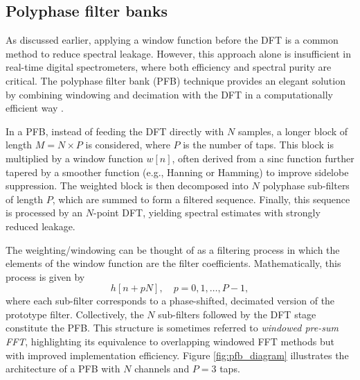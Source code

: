 
\subsection{Polyphase filter banks}
As discussed earlier, applying a window function before the DFT is a common method to reduce spectral leakage. However, this approach alone is insufficient in real-time digital spectrometers, where both efficiency and spectral purity are critical. The polyphase filter bank (PFB) technique provides an elegant solution by combining windowing and decimation with the DFT in a computationally efficient way \citep{Harris1978}.

In a PFB, instead of feeding the DFT directly with $N$ samples, a longer block of length $M = N \times P$ is considered, where $P$ is the number of taps. This block is multiplied by a window function $w[n]$, often derived from a sinc function further tapered by a smoother function (e.g., Hanning or Hamming) to improve sidelobe suppression. The weighted block is then decomposed into $N$ polyphase sub-filters of length $P$, which are summed to form a filtered sequence. Finally, this sequence is processed by an $N$-point DFT, yielding spectral estimates with strongly reduced leakage.

The weighting/windowing can be thought of as a filtering process in which the elements of the window function are the filter coefficients. Mathematically, this process is given by
\begin{equation}
    h[n + pN], \quad p = 0,1,\ldots,P-1,
\end{equation}
where each sub-filter corresponds to a phase-shifted, decimated version of the prototype filter. Collectively, the $N$ sub-filters followed by the DFT stage constitute the PFB. This structure is sometimes referred to \textit{windowed pre-sum FFT}, highlighting its equivalence to overlapping windowed FFT methods but with improved implementation efficiency. Figure \ref{fig:pfb_diagram} illustrates the architecture of a PFB with $N$ channels and $P=3$ taps.

